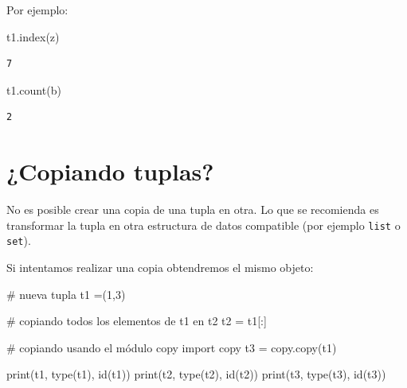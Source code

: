\documentclass[
  spanish,
  letterpaper,
]{scrbook}
\newenvironment{Shaded}{\begin{snugshade}}{\end{snugshade}}
\newcommand{\BuiltInTok}[1]{\textcolor[rgb]{0.00,0.23,0.31}{#1}}
\newcommand{\CommentTok}[1]{\textcolor[rgb]{0.37,0.37,0.37}{#1}}
\newcommand{\DecValTok}[1]{\textcolor[rgb]{0.68,0.00,0.00}{#1}}
\newcommand{\ImportTok}[1]{\textcolor[rgb]{0.00,0.46,0.62}{#1}}
\newcommand{\NormalTok}[1]{\textcolor[rgb]{0.00,0.23,0.31}{#1}}
\newcommand{\OperatorTok}[1]{\textcolor[rgb]{0.37,0.37,0.37}{#1}}
\newcommand{\StringTok}[1]{\textcolor[rgb]{0.13,0.47,0.30}{#1}}
\theoremstyle{definition}
\theoremstyle{remark}
\begin{document}
Por ejemplo:

\begin{Shaded}
\begin{Highlighting}[]
\NormalTok{t1.index(}\StringTok{\textquotesingle{}z\textquotesingle{}}\NormalTok{)}
\end{Highlighting}
\end{Shaded}

\begin{verbatim}
7
\end{verbatim}

\begin{Shaded}
\begin{Highlighting}[]
\NormalTok{t1.count(}\StringTok{\textquotesingle{}b\textquotesingle{}}\NormalTok{)}
\end{Highlighting}
\end{Shaded}

\begin{verbatim}
2
\end{verbatim}

\section{¿Copiando tuplas?}\label{copiando-tuplas}

No es posible crear una copia de una tupla en otra. Lo que se recomienda
es transformar la tupla en otra estructura de datos compatible (por
ejemplo \texttt{list} o \texttt{set}).

Si intentamos realizar una copia obtendremos el mismo objeto:

\begin{Shaded}
\begin{Highlighting}[]
\CommentTok{\# nueva tupla}
\NormalTok{t1 }\OperatorTok{=}\NormalTok{(}\DecValTok{1}\NormalTok{,}\DecValTok{3}\NormalTok{) }

\CommentTok{\# copiando todos los elementos de t1 en t2}
\NormalTok{t2 }\OperatorTok{=}\NormalTok{ t1[:] }

\CommentTok{\# copiando usando el módulo copy}
\ImportTok{import}\NormalTok{ copy}
\NormalTok{t3 }\OperatorTok{=}\NormalTok{ copy.copy(t1)}
\end{Highlighting}
\end{Shaded}

\begin{Shaded}
\begin{Highlighting}[]
\BuiltInTok{print}\NormalTok{(t1, }\BuiltInTok{type}\NormalTok{(t1), }\BuiltInTok{id}\NormalTok{(t1))}
\BuiltInTok{print}\NormalTok{(t2, }\BuiltInTok{type}\NormalTok{(t2), }\BuiltInTok{id}\NormalTok{(t2))}
\BuiltInTok{print}\NormalTok{(t3, }\BuiltInTok{type}\NormalTok{(t3), }\BuiltInTok{id}\NormalTok{(t3))}
\end{Highlighting}
\end{Shaded}
\end{document}
